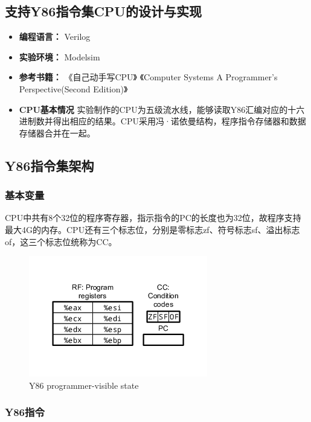 \documentclass[12pt]{article}
\begin{document}
\begin{CJK*}{GB}{gbsn}

\section{支持Y86指令集CPU的设计与实现}\label{ux652fux6301y86ux6307ux4ee4ux96c6cpuux7684ux8bbeux8ba1ux4e0eux5b9eux73b0}

\begin{itemize}
\item
  \textbf{编程语言：} Verilog
\item
  \textbf{实验环境：} Modelsim
\item
  \textbf{参考书籍：} 《自己动手写CPU》 《Computer Systems A
  Programmer's Perspective(Second Edition)》
\item
  \textbf{CPU基本情况}
  实验制作的CPU为五级流水线，能够读取Y86汇编对应的十六进制数并得出相应的结果。CPU采用冯·诺依曼结构，程序指令存储器和数据存储器合并在一起。
\end{itemize}

\subsection{Y86指令集架构}\label{y86ux6307ux4ee4ux96c6ux67b6ux6784}

\subsubsection{基本变量}\label{ux57faux672cux53d8ux91cf}

CPU中共有8个32位的程序寄存器，指示指令的PC的长度也为32位，故程序支持最大4G的内存。CPU还有三个标志位，分别是零标志zf、符号标志sf、溢出标志of，这三个标志位统称为CC。

\begin{figure}[htbp]
\centering
\includegraphics{img/state.png}
\caption{Y86 programmer-visible state}
\end{figure}

\subsubsection{Y86指令}\label{y86ux6307ux4ee4}


\end{CJK*}
\end{document}
